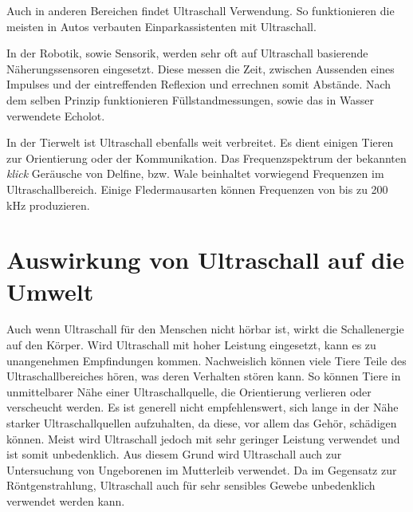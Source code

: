 Auch in anderen Bereichen findet Ultraschall Verwendung. So funktionieren die meisten in Autos verbauten Einparkassistenten mit Ultraschall.

In der Robotik, sowie Sensorik, werden sehr oft auf Ultraschall basierende Näherungssensoren eingesetzt. Diese messen die Zeit, zwischen Aussenden eines Impulses und der eintreffenden Reflexion und errechnen somit Abstände. Nach dem selben Prinzip funktionieren  Füllstandmessungen, sowie das in Wasser verwendete Echolot.

In der Tierwelt ist Ultraschall ebenfalls weit verbreitet. Es dient einigen Tieren zur Orientierung oder der Kommunikation. Das Frequenzspektrum der bekannten \emph{klick} Geräusche von Delfine, bzw. Wale beinhaltet vorwiegend Frequenzen im Ultraschallbereich.
Einige Fledermausarten können Frequenzen von bis zu 200 kHz produzieren.

\section{Auswirkung von Ultraschall auf die Umwelt}
Auch wenn Ultraschall für den Menschen nicht hörbar ist, wirkt die Schallenergie auf den Körper. Wird Ultraschall mit hoher Leistung eingesetzt, kann es zu unangenehmen Empfindungen kommen. Nachweislich können viele Tiere Teile des Ultraschallbereiches hören, was deren Verhalten stören kann. So können Tiere in unmittelbarer Nähe einer Ultraschallquelle, die Orientierung verlieren oder verscheucht werden. Es ist generell nicht empfehlenswert, sich lange in der Nähe starker Ultraschallquellen aufzuhalten, da diese, vor allem das Gehör, schädigen können. Meist wird Ultraschall jedoch mit sehr geringer Leistung verwendet und ist somit unbedenklich. Aus diesem Grund wird Ultraschall auch zur Untersuchung von Ungeborenen im Mutterleib verwendet. Da im Gegensatz zur Röntgenstrahlung, Ultraschall auch für sehr sensibles Gewebe unbedenklich verwendet werden kann.